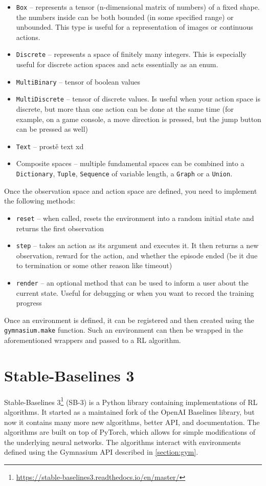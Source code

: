 \documentclass[
  digital,     %
  oneside,     %
  nosansbold,  %
  nocolorbold, %
  lof,         %
  lot,         %
]{fithesis4}
\begin{document}
\begin{itemize}
    \item \texttt{Box} -- represents a tensor (n-dimensional matrix of numbers) of a fixed shape. the numbers inside can be both bounded (in some specified range) or unbounded. This type is useful for a representation of images or continuous actions.
    \item \texttt{Discrete} -- represents a space of finitely many integers. This is especially useful for discrete action spaces and acts essentially as an enum.
    \item \texttt{MultiBinary} -- tensor of boolean values
    \item \texttt{MultiDiscrete} -- tensor of discrete values. Is useful when your action space is discrete, but more than one action can be done at the same time (for example, on a game console, a move direction is pressed, but the jump button can be pressed as well)
    \item \texttt{Text} -- prostě text xd
    \item Composite spaces -- multiple fundamental spaces can be combined into a \texttt{Dictionary}, \texttt{Tuple}, \texttt{Sequence} of variable length, a \texttt{Graph} or a \texttt{Union}.
\end{itemize}

Once the observation space and action space are defined, you need to implement the following methods:

\begin{itemize}
    \item \texttt{reset} -- when called, resets the environment into a random initial state and returns the first observation
    \item \texttt{step} -- takes an action as its argument and executes it. It then returns a new observation, reward for the action, and whether the episode ended (be it due to termination or some other reason like timeout)
    \item \texttt{render} -- an optional method that can be used to inform a user about the current state. Useful for debugging or when you want to record the training progress
\end{itemize}

Once an environment is defined, it can be registered and then created using the \texttt{gymnasium.make} function. Such an environment can then be wrapped in the aforementioned wrappers and passed to a RL algorithm.

\section{Stable-Baselines 3}
Stable-Baselines 3\footnote{\url{https://stable-baselines3.readthedocs.io/en/master/}} (SB-3) is a Python library containing implementations of RL algorithms. It started as a maintained fork of the OpenAI Baselines library, but now it contains many more new algorithms, better API, and documentation. The algorithms are built on top of PyTorch, which allows for simple modifications of the underlying neural networks. The algorithms interact with environments defined using the Gymnasium API described in \autoref{section:gym}.
\end{document}
